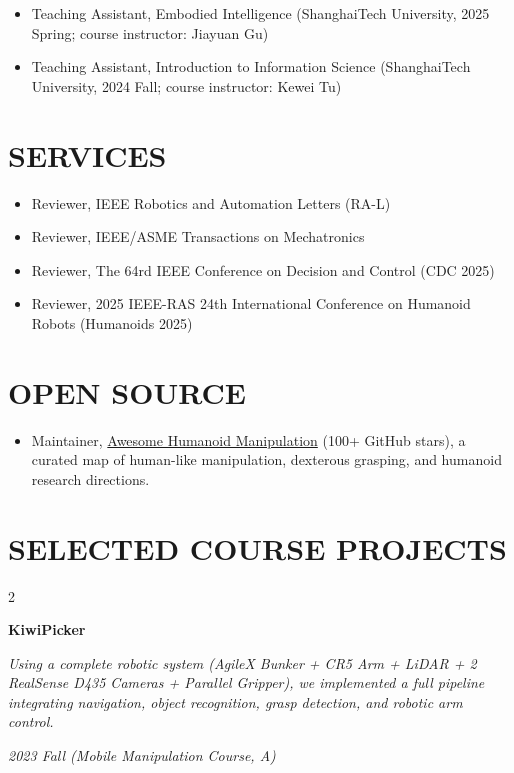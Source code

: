 \documentclass[10pt, letterpaper]{article}
\newenvironment{twocolentry}[2][]{
    \onecolentry
    \def\secondColumn{#2}
    \setcolumnwidth{\fill, 4.5 cm}
    \begin{paracol}{2}
}{
    \switchcolumn \raggedleft \secondColumn
    \end{paracol}
    \endonecolentry
} %
\let\hrefWithoutArrow\href
\renewcommand{\href}[2]{\hrefWithoutArrow{#1}{\ifthenelse{\equal{#2}{}}{ }{#2 }\raisebox{.15ex}{\footnotesize \faExternalLink*}}}
\begin{document}
\begin{itemize}
    \item Teaching Assistant, Embodied Intelligence (ShanghaiTech University, 2025 Spring; course instructor: Jiayuan Gu)
    \item Teaching Assistant, Introduction to Information Science (ShanghaiTech University, 2024 Fall; course instructor: Kewei Tu)
\end{itemize}

\section{SERVICES}

\begin{itemize}
    \item Reviewer, IEEE Robotics and Automation Letters (RA-L)
    \item Reviewer, IEEE/ASME Transactions on Mechatronics
    \item Reviewer, The 64rd IEEE Conference on Decision and Control (CDC 2025)
    \item Reviewer, 2025 IEEE-RAS 24th International Conference on Humanoid Robots (Humanoids 2025)
\end{itemize}

\section{OPEN SOURCE}

\begin{itemize}
    \item Maintainer, \hrefWithoutArrow{https://github.com/Tsunami-kun/awesome-humanoid-manipulation}{Awesome Humanoid Manipulation} (100+ GitHub stars), a curated map of human-like manipulation, dexterous grasping, and humanoid research directions.
\end{itemize}

\section{SELECTED COURSE PROJECTS}

\begin{twocolentry}{
\textit{}    
    
\textit{2023 Fall (Mobile Manipulation Course, A)}}
\textbf{KiwiPicker}\xspace
    
    \textit{Using a complete robotic system (AgileX Bunker + CR5 Arm + LiDAR + 2 RealSense D435 Cameras + Parallel Gripper), we implemented a full pipeline integrating navigation, object recognition, grasp detection, and robotic arm control. }

    \textit{ }
\end{twocolentry}
\end{document}
